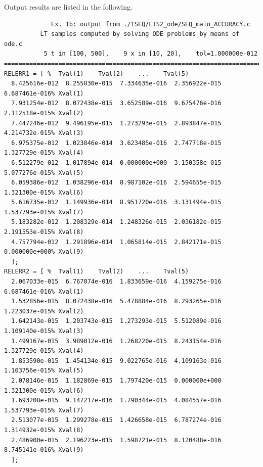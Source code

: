 \documentclass[a4paper,10pt]{report}%
\begin{document}
\newpage
\noindent Output results are listed in the following.
\begin{lstlisting}
             Ex. 1b: output from ./1SEQ/LTS2_ode/SEQ_main_ACCURACY.c
          LT samples computed by solving ODE problems by means of ode.c
           5 t in [100, 500],    9 x in [10, 20],    tol=1.000000e-012
====================================================================================
RELERR1 = [ %  Tval(1)    Tval(2)    ...    Tval(5)
  8.425616e-012  8.255830e-015  7.334635e-016  2.356922e-015  6.687461e-016% Xval(1)
  7.931254e-012  8.072438e-015  3.652589e-016  9.675476e-016  2.112518e-015% Xval(2)
  7.447246e-012  9.496195e-015  1.273293e-015  2.893847e-015  4.214732e-015% Xval(3)
  6.975375e-012  1.023846e-014  3.623485e-016  2.747718e-015  1.327729e-015% Xval(4)
  6.512279e-012  1.017894e-014  0.000000e+000  3.150358e-015  5.077276e-015% Xval(5)
  6.059386e-012  1.038296e-014  8.987102e-016  2.594655e-015  1.321300e-015% Xval(6)
  5.616735e-012  1.149936e-014  8.951720e-016  3.131494e-015  1.537793e-015% Xval(7)
  5.183282e-012  1.208329e-014  1.248326e-015  2.036182e-015  2.191553e-015% Xval(8)
  4.757794e-012  1.291896e-014  1.065814e-015  2.842171e-015  0.000000e+000% Xval(9)
  ];
RELERR2 = [ %  Tval(1)    Tval(2)    ...    Tval(5)
  2.067033e-015  6.767074e-016  1.833659e-016  4.159275e-016  6.687461e-016% Xval(1)
  1.532856e-015  8.072438e-016  5.478884e-016  8.293265e-016  1.223037e-015% Xval(2)
  1.642143e-015  1.203743e-015  1.273293e-015  5.512089e-016  1.109140e-015% Xval(3)
  1.499167e-015  3.989012e-016  1.268220e-015  8.243154e-016  1.327729e-015% Xval(4)
  1.853590e-015  1.454134e-015  9.022765e-016  4.109163e-016  1.103756e-015% Xval(5)
  2.078146e-015  1.182869e-015  1.797420e-015  0.000000e+000  1.321300e-015% Xval(6)
  1.693208e-015  9.147217e-016  1.790344e-015  4.084557e-016  1.537793e-015% Xval(7)
  2.513077e-015  1.299278e-015  1.426658e-015  6.787274e-016  1.314932e-015% Xval(8)
  2.486900e-015  2.196223e-015  1.598721e-015  8.120488e-016  8.745141e-016% Xval(9)
  ];
\end{lstlisting}
\end{document}
